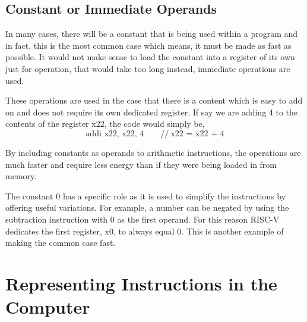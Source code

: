 \documentclass[12pt]{article}
\begin{document}
    \subsection*{Constant or Immediate Operands}
    \par In many cases, there will be a constant that is being used within a
    program and in fact, this is the most common case which means, it must be
    made as fast as possible. It would not make sense to load the constant into
    a register of its own just for operation, that would take too long instead,
    immediate operations are used.
    \par These operations are used in the case that there is a content which is
    easy to add on and does not require its own dedicated register. If say we
    are adding 4 to the contents of the register x22, the code would simply be,
    \[
        \text{addi x22, x22, 4}\qquad //\ \text{x22 = x22 + 4}
    \]
    \par By including constants as operands to arithmetic instructions, the
    operations are much faster and require less energy than if they were being
    loaded in from memory.
    \par The constant 0 has a specific role as it is used to simplify the
    instructions by offering useful variations. For example, a number can be
    negated by using the subtraction instruction with 0 as the first operand.
    For this reason RISC-V dedicates the first register, x0, to always equal 0.
    This is another example of making the common case fast.
    \section*{Representing Instructions in the Computer}
\end{document}
